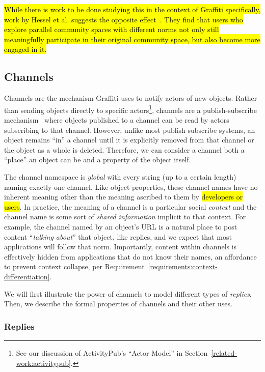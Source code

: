 \hl{%
While there is work to be done studying this in the context of Graffiti specifically,
work by Hessel et al.
suggests the opposite effect~{\cite{highlyrelatedcommunities}}.
They find that users who explore parallel community spaces
with different norms not only still meaningfully participate in their original community space,
but also become more engaged in it.
}%

\subsection{Channels}
\label{concepts:channels}

Channels are the mechanism Graffiti uses to notify
actors of new objects.
Rather than sending objects directly to specific actors\footnote{
    See our discussion of ActivityPub's ``Actor Model'' in Section~\ref{related-work:activitypub}.
},
channels are a publish-subscribe mechanism~\cite{pubsub}
where objects published to a channel
can be read by actors subscribing to that channel.
However, unlike most publish-subscribe systems,
an object remains ``in'' a channel until
it is explicitly removed from that channel
or the object as a whole is deleted.
Therefore, we can consider a channel both a ``place''
an object can be and a property of the object itself.

The channel namespace is \emph{global} with every string (up to a certain length)
naming exactly one channel.
Like object properties, these channel names have no inherent meaning
other than the meaning ascribed to them by \hl{developers or users}.
In practice, the meaning of a channel is a particular social \emph{context} and the channel
name is some sort of \emph{shared information} implicit to that context.
For example, the channel named by an object's URL is a natural place to post content ``\emph{talking about}'' that object, like replies, and we expect that most applications will follow that norm.
Importantly, content within channels is effectively hidden from applications
that do not know their names,
an affordance to prevent context collapse, per Requirement~\ref{requirements:context-differentiation}.

We will first illustrate the power of channels
to model different types of \emph{replies}.
Then, we describe the formal properties of channels and their other uses.

\subsubsection{Replies}

